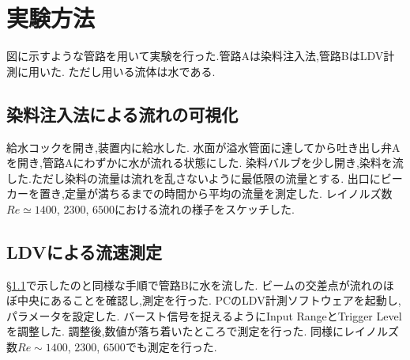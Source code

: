 \section{実験方法}
図に示すような管路を用いて実験を行った.管路Aは染料注入法,管路BはLDV計測に用いた.
ただし用いる流体は水である.
\subsection{染料注入法による流れの可視化}
\label{sec:染料}
給水コックを開き,装置内に給水した.
水面が溢水管面に達してから吐き出し弁Aを開き,管路Aにわずかに水が流れる状態にした.
染料バルブを少し開き,染料を流した.ただし染料の流量は流れを乱さないように最低限の流量とする.
出口にビーカーを置き,定量が満ちるまでの時間から平均の流量を測定した.
レイノルズ数$Re\simeq1400$, $2300$, $6500$における流れの様子をスケッチした.
\subsection{LDVによる流速測定}
\S\ref{sec:染料}で示したのと同様な手順で管路Bに水を流した.
ビームの交差点が流れのほぼ中央にあることを確認し,測定を行った.
PCのLDV計測ソフトウェアを起動し,パラメータを設定した.
バースト信号を捉えるようにInput RangeとTrigger Levelを調整した.
調整後,数値が落ち着いたところで測定を行った.
同様にレイノルズ数$Re\sim1400$, $2300$, $6500$でも測定を行った.
